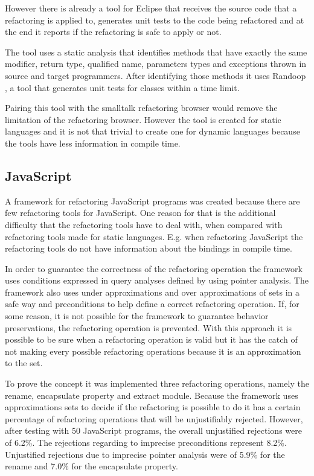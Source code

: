 %
However there is already a tool \cite{soares2010making} for Eclipse that receives the source code that a refactoring is applied to, generates unit tests to the code being refactored and at the end it reports if the refactoring is safe to apply or not.

The tool uses a static analysis that identifies methods that have exactly the same modifier, return type, qualified name, parameters types and exceptions thrown in source and target programmers.
After identifying those methods it uses Randoop \cite{pacheco2007feedback}, a tool that generates unit tests for classes within a time limit.

Pairing this tool with the smalltalk refactoring browser would remove the limitation of the refactoring browser.
However the tool is created for static languages and it is not that trivial to create one for dynamic languages because the tools have less information in compile time.

\subsection{JavaScript}

A framework \cite{feldthaus2011tool} for refactoring JavaScript programs was created because there are few refactoring tools for JavaScript. 
One reason for that is the additional difficulty that the refactoring tools have to deal with, when compared with refactoring tools made for static languages. 
E.g. when refactoring JavaScript the refactoring tools do not have information about the bindings in compile time.


In order to guarantee the correctness of the refactoring operation the framework uses conditions expressed in query analyses defined by using pointer analysis.
The framework also uses under approximations and over approximations of sets in a safe way  and preconditions to help define a correct refactoring operation.
If, for some reason, it is not possible for the framework to guarantee behavior preservations, the refactoring operation is prevented.
With this approach it is possible to be sure when a refactoring operation is valid but it has the catch of not making every possible refactoring operations because it is an approximation to the set.


To prove the concept it was implemented three refactoring operations, namely the rename, encapsulate property and extract module.
Because the framework uses approximations sets to decide if the refactoring is possible to do it has a certain percentage of refactoring operations that will be unjustifiably rejected.
However, after testing with 50 JavaScript programs, the overall unjustified rejections were of 6.2\%. 
The rejections regarding to imprecise preconditions represent 8.2\%.
Unjustified rejections due to imprecise pointer analysis were of 5.9\% for the rename and 7.0\% for the encapsulate property. 


